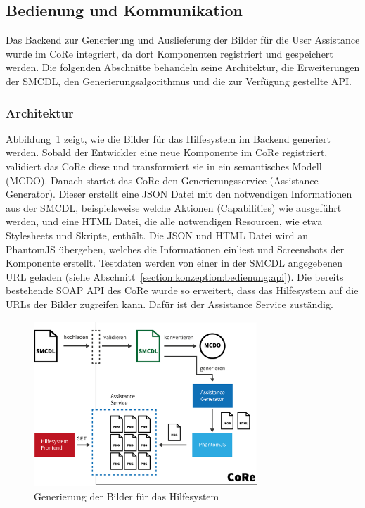 \documentclass[
	headsepline,
	footsepline,
	fontsize=12pt,
	bibliography=totoc
]{scrbook}
\begin{document}
\subsection{Bedienung und Kommunikation}
\label{section:implementierung:backend:bedienung}

Das Backend zur Generierung und Auslieferung der Bilder für die User Assistance wurde im CoRe integriert, da dort Komponenten registriert und gespeichert werden. Die folgenden Abschnitte behandeln seine Architektur, die Erweiterungen der SMCDL, den Generierungsalgorithmus und die zur Verfügung gestellte API.

\subsubsection{Architektur}

Abbildung~\ref{figure:bedienung-backend} zeigt, wie die Bilder für das Hilfesystem im Backend generiert werden. Sobald der Entwickler eine neue Komponente im CoRe registriert, validiert das CoRe diese und transformiert sie in ein semantisches Modell (MCDO). Danach startet das CoRe den Generierungsservice (Assistance Generator). Dieser erstellt eine JSON Datei mit den notwendigen Informationen aus der SMCDL, beispielsweise welche Aktionen (Capabilities) wie ausgeführt werden, und eine HTML Datei, die alle notwendigen Resourcen, wie etwa Stylesheets und Skripte, enthält. Die JSON und HTML Datei wird an PhantomJS übergeben, welches die Informationen einliest und Screenshots der Komponente erstellt. Testdaten werden von einer in der SMCDL angegebenen URL geladen (siehe Abschnitt~\ref{section:konzeption:bedienung:api}). Die bereits bestehende SOAP API des CoRe wurde so erweitert, dass das Hilfesystem auf die URLs der Bilder zugreifen kann. Dafür ist der Assistance Service zuständig.

\begin{figure}[htbp]
   \centering
   \includegraphics[width=0.75\textwidth]{images/implementierung-bedienung-backend.png}
   \caption{Generierung der Bilder für das Hilfesystem}
   \label{figure:bedienung-backend}
\end{figure}
\end{document}
